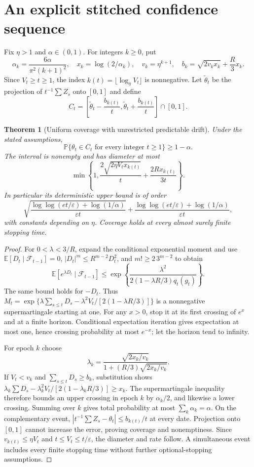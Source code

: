 \documentclass[11pt,a4paper]{article}
\newtheorem{theorem}{Theorem}[section]
\theoremstyle{remark}
\newcommand{\E}{\mathbb E}
\newcommand{\Prob}{\mathbb P}
\begin{document}
\section{An explicit stitched confidence sequence}
Fix $\eta>1$ and $\alpha\in(0,1)$. For integers $k\ge0$, put
\[
 \alpha_k=\frac{6\alpha}{\pi^2(k+1)^2},\quad
 x_k=\log(2/\alpha_k),\quad v_k=\eta^{k+1},\quad
 b_k=\sqrt{2v_kx_k}+\frac R3x_k.
\]
Since $V_t\ge t\ge1$, the index $k(t)=\lfloor\log_\eta V_t\rfloor$ is nonnegative. Let $\widetilde\theta_t$ be the projection of $t^{-1}\sum Z_s$ onto $[0,1]$ and define
\[
 C_t=\left[\widetilde\theta_t-\frac{b_{k(t)}}t,
           \widetilde\theta_t+\frac{b_{k(t)}}t\right]\cap[0,1].
\]
\begin{theorem}[Uniform coverage with unrestricted predictable drift]
Under the stated assumptions,
\[
 \Prob\{\theta_t\in C_t\text{ for every integer }t\ge1\}\ge1-\alpha.
\]
The interval is nonempty and has diameter at most
\[
 \min\left\{1,\frac{2\sqrt{2\eta V_t x_{k(t)}}}{t}
                  +\frac{2Rx_{k(t)}}{3t}\right\}.
\]
In particular its deterministic upper bound is of order
\[
 \sqrt{\frac{\log\log(et/\varepsilon)+\log(1/\alpha)}{\varepsilon t}}
 +\frac{\log\log(et/\varepsilon)+\log(1/\alpha)}{\varepsilon t},
\]
with constants depending on $\eta$. Coverage holds at every almost surely finite stopping time.
\end{theorem}
\begin{proof}
For $0<\lambda<3/R$, expand the conditional exponential moment and use $\E[D_t\mid\mathcal F_{t-1}]=0$, $|D_t|^m\le R^{m-2}D_t^2$, and $m!\ge2\,3^{m-2}$ to obtain
\[
 \E[e^{\lambda D_t}\mid\mathcal F_{t-1}]
 \le\exp\left\{\frac{\lambda^2}{2(1-\lambda R/3)q_t(g_t)}\right\}.
\]
The same bound holds for $-D_t$. Thus
$M_t=\exp\{\lambda\sum_{s\le t}D_s-\lambda^2V_t/[2(1-\lambda R/3)]\}$
is a nonnegative supermartingale starting at one. For any $x>0$, stop it at its first crossing of $e^x$ and at a finite horizon. Conditional expectation iteration gives expectation at most one, hence crossing probability at most $e^{-x}$; let the horizon tend to infinity.

For epoch $k$ choose
\[
 \lambda_k=\frac{\sqrt{2x_k/v_k}}{1+(R/3)\sqrt{2x_k/v_k}}.
\]
If $V_t<v_k$ and $\sum_{s\le t}D_s\ge b_k$, substitution shows
$\lambda_k\sum D_s-\lambda_k^2V_t/[2(1-\lambda_kR/3)]\ge x_k$.
The supermartingale inequality therefore bounds an upper crossing in epoch $k$ by $\alpha_k/2$, and likewise a lower crossing. Summing over $k$ gives total probability at most $\sum_k\alpha_k=\alpha$. On the complementary event, $|t^{-1}\sum Z_s-\theta_t|\le b_{k(t)}/t$ at every date. Projection onto $[0,1]$ cannot increase the error, proving coverage and nonemptiness. Since $v_{k(t)}\le\eta V_t$ and $t\le V_t\le t/\varepsilon$, the diameter and rate follow. A simultaneous event includes every finite stopping time without further optional-stopping assumptions.
\end{proof}
\end{document}
